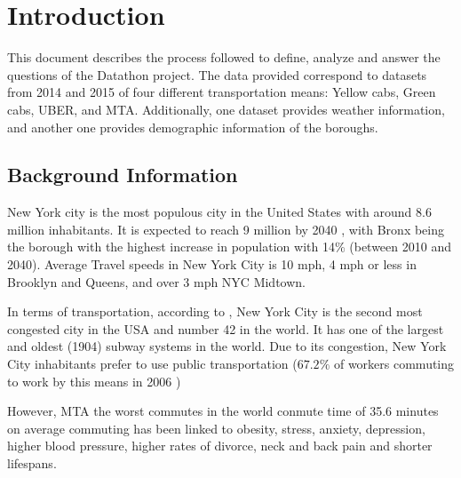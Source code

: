 \section{Introduction}
\label{intro}
This document describes the process followed to define, analyze and answer  the questions of the Datathon project. The data provided correspond to datasets from 2014 and 2015 of four different transportation means: Yellow cabs, Green cabs, UBER, and MTA. Additionally, one dataset provides weather information, and another one provides demographic information of the boroughs. 


\subsection{Background Information}
\label{intro_background}

New York city is the most populous city in the United States \cite{wikiNYC} with around 8.6 million inhabitants. It is expected to reach 9 million by 2040 \cite{growthNYC}, with Bronx being the borough with the highest increase in population with 14\% (between 2010 and 2040). Average Travel speeds in New York City is 10 mph, 4 mph or less in Brooklyn and Queens, and over 3 mph NYC Midtown. 


In terms of transportation, according to \cite{trafficNYC2}, New York City is the second most congested city in the USA and number 42 in the world. It has one of the largest and oldest (1904) subway systems in the world. Due to its congestion, New York City inhabitants prefer to use public transportation ($67.2\%$ of workers commuting to work by this means in 2006 \cite{wikiNYC})

However, MTA the worst commutes in the world \cite{commuteWorld} conmute time of 35.6 minutes on average commuting has been linked to obesity, stress, anxiety, depression, higher blood pressure, higher rates of divorce, neck and back pain and shorter lifespans.





%
% 
% 

